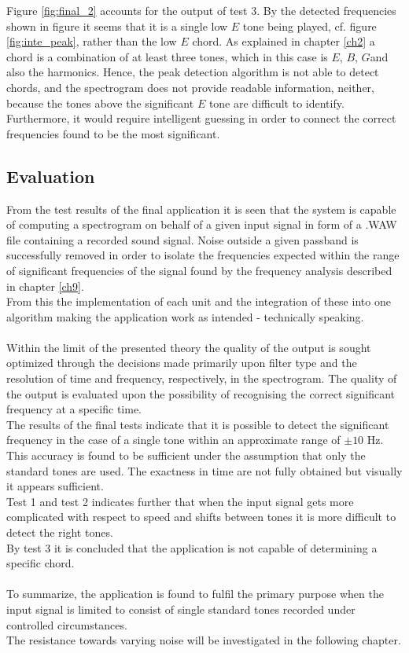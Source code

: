 Figure \ref{fig:final_2} accounts for the output of test 3. By the detected frequencies shown in figure \label{fig:final_peak2} it seems that it is a single low $E$ tone being played, cf. figure \ref{fig:inte_peak}, rather than the low $E$ chord. As explained in chapter \ref{ch2} a chord is a combination of at least three tones, which in this case is $E$, $B$, $G$\hashsharp and also the harmonics. Hence, the peak detection algorithm is not able to detect chords, and the spectrogram does not provide readable information, neither, because the tones above the significant $E$ tone are difficult to identify. Furthermore, it would require intelligent guessing in order to connect the correct frequencies found to be the most significant.

\subsection{Evaluation}
From the test results of the final application it is seen that the system is capable of computing a spectrogram on behalf of a given input signal in form of a .WAW file containing a recorded sound signal. Noise outside a given passband is successfully removed in order to isolate the frequencies expected within the range of significant frequencies of the signal found by the frequency analysis described in chapter \ref{ch9}. \\
From this the implementation of each unit and the integration of these into one algorithm making the application work as intended - technically speaking. \\
\\
Within the limit of the presented theory the quality of the output is sought optimized through the decisions made primarily upon filter type and the resolution of time and frequency, respectively, in the spectrogram.
The quality of the output is evaluated upon the possibility of recognising the correct significant frequency at a specific time. \\
The results of the final tests indicate that it is possible to detect the significant frequency in the case of a single tone within an approximate range of $\pm 10$ Hz. This accuracy is found to be sufficient under the assumption that only the standard tones are used. The exactness in time are not fully obtained but visually it appears sufficient. \\        
Test 1 and test 2 indicates further that when the input signal gets more complicated with respect to speed and shifts between tones it is more difficult to detect the right tones. \\
By test 3 it is concluded that the application is not capable of determining a specific chord. \\   
\\
To summarize, the application is found to fulfil the primary purpose when the input signal is limited to consist of single standard tones recorded under controlled circumstances. \\
The resistance towards varying noise will be investigated in the following chapter.           